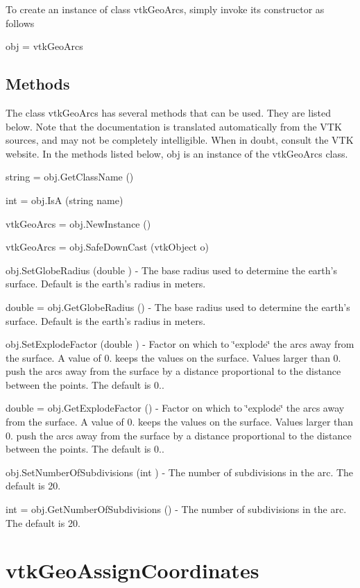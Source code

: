To create an instance of class vtk\-Geo\-Arcs, simply invoke its constructor as follows \begin{DoxyVerb}  obj = vtkGeoArcs
\end{DoxyVerb}
 \hypertarget{vtkwidgets_vtkxyplotwidget_Methods}{}\subsection{Methods}\label{vtkwidgets_vtkxyplotwidget_Methods}
The class vtk\-Geo\-Arcs has several methods that can be used. They are listed below. Note that the documentation is translated automatically from the V\-T\-K sources, and may not be completely intelligible. When in doubt, consult the V\-T\-K website. In the methods listed below, {\ttfamily obj} is an instance of the vtk\-Geo\-Arcs class. 
\begin{DoxyItemize}
\item {\ttfamily string = obj.\-Get\-Class\-Name ()}  
\item {\ttfamily int = obj.\-Is\-A (string name)}  
\item {\ttfamily vtk\-Geo\-Arcs = obj.\-New\-Instance ()}  
\item {\ttfamily vtk\-Geo\-Arcs = obj.\-Safe\-Down\-Cast (vtk\-Object o)}  
\item {\ttfamily obj.\-Set\-Globe\-Radius (double )} -\/ The base radius used to determine the earth's surface. Default is the earth's radius in meters.  
\item {\ttfamily double = obj.\-Get\-Globe\-Radius ()} -\/ The base radius used to determine the earth's surface. Default is the earth's radius in meters.  
\item {\ttfamily obj.\-Set\-Explode\-Factor (double )} -\/ Factor on which to \char`\"{}explode\char`\"{} the arcs away from the surface. A value of 0. keeps the values on the surface. Values larger than 0. push the arcs away from the surface by a distance proportional to the distance between the points. The default is 0..  
\item {\ttfamily double = obj.\-Get\-Explode\-Factor ()} -\/ Factor on which to \char`\"{}explode\char`\"{} the arcs away from the surface. A value of 0. keeps the values on the surface. Values larger than 0. push the arcs away from the surface by a distance proportional to the distance between the points. The default is 0..  
\item {\ttfamily obj.\-Set\-Number\-Of\-Subdivisions (int )} -\/ The number of subdivisions in the arc. The default is 20.  
\item {\ttfamily int = obj.\-Get\-Number\-Of\-Subdivisions ()} -\/ The number of subdivisions in the arc. The default is 20.  
\end{DoxyItemize}\hypertarget{vtkgeovis_vtkgeoassigncoordinates}{}\section{vtk\-Geo\-Assign\-Coordinates}\label{vtkgeovis_vtkgeoassigncoordinates}
